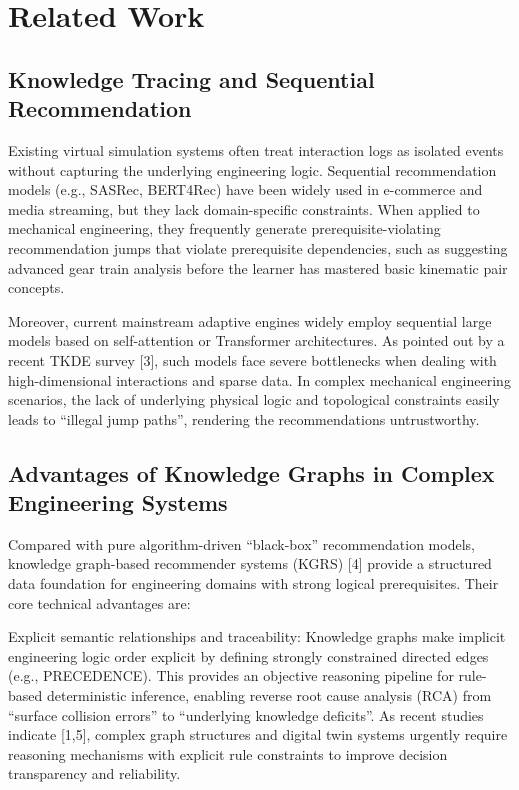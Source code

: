 \documentclass{ieeeaccess}
\begin{document}
\section{Related Work}
\label{sec:related}

\subsection{Knowledge Tracing and Sequential Recommendation}
Existing virtual simulation systems often treat interaction logs as isolated events without capturing the underlying engineering logic. Sequential recommendation models (e.g., SASRec, BERT4Rec) have been widely used in e-commerce and media streaming, but they lack domain-specific constraints. When applied to mechanical engineering, they frequently generate prerequisite-violating recommendation jumps that violate prerequisite dependencies, such as suggesting advanced gear train analysis before the learner has mastered basic kinematic pair concepts.

Moreover, current mainstream adaptive engines widely employ sequential large models based on self-attention or Transformer architectures. As pointed out by a recent TKDE survey [3], such models face severe bottlenecks when dealing with high-dimensional interactions and sparse data. In complex mechanical engineering scenarios, the lack of underlying physical logic and topological constraints easily leads to ``illegal jump paths'', rendering the recommendations untrustworthy.

\subsection{Advantages of Knowledge Graphs in Complex Engineering Systems}
Compared with pure algorithm-driven ``black-box'' recommendation models, knowledge graph-based recommender systems (KGRS) [4] provide a structured data foundation for engineering domains with strong logical prerequisites. Their core technical advantages are:

Explicit semantic relationships and traceability: Knowledge graphs make implicit engineering logic order explicit by defining strongly constrained directed edges (e.g., PRECEDENCE). This provides an objective reasoning pipeline for rule-based deterministic inference, enabling reverse root cause analysis (RCA) from ``surface collision errors'' to ``underlying knowledge deficits''. As recent studies indicate [1,5], complex graph structures and digital twin systems urgently require reasoning mechanisms with explicit rule constraints to improve decision transparency and reliability.
\end{document}
